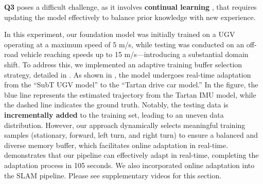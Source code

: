 \textbf{Q3} poses a difficult challenge, as it involves \textbf{continual learning} \cite{lesort2019continuallearningroboticsdefinition, SurveyDLRobotics}, that requires updating the model effectively to balance prior knowledge with new experience.

In this experiment, our foundation model was initially trained on a UGV operating at a maximum speed of 5 m/s, while testing was conducted on an off-road vehicle reaching speeds up to 15 m/s—introducing a substantial domain shift. To address this, we implemented an adaptive training buffer selection strategy, detailed in . As shown in , the model undergoes real-time adaptation from the “SubT UGV model” to the “Tartan drive car model.” In the figure, the blue line represents the estimated trajectory from the Tartan IMU model, while the dashed line indicates the ground truth. Notably, the testing data is \textbf{incrementally added} to the training set, leading to an uneven data distribution. However, our approach dynamically selects meaningful training samples (stationary, forward, left turn, and right turn) to ensure a balanced and diverse memory buffer, which facilitates online adaptation in real-time.  demonstrates that our pipeline can effectively adapt in real-time, completing the adaptation process in 105 seconds. We also incorporated online adaptation into the SLAM pipeline. Please see supplementary videos for this section. 


